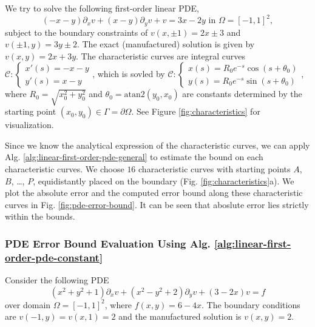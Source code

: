 \documentclass[accepted]{uai2023}
\begin{document}
    We try to solve the following first-order linear PDE,
    {
        \small
        \begin{equation} \label{eq:attractor}
            (-x -y) \partial_x v + (x - y) \partial_y v + v = 3x - 2y \text{ in } \Omega=[-1, 1]^2,
        \end{equation}
    }
    subject to the boundary constraints of $v(x, \pm1) =2x\pm 3$ and $v(\pm 1, y) = 3y \pm 2$. 
    The exact (manufactured) solution is given by $v(x, y) = 2x + 3y$.
    The characteristic curves are integral curves {\small $\mathcal{C}: \begin{cases*} x'(s) = -x - y \\[-0.25em] y'(s) = x - y \end{cases*}$}, which is sovled by {\small $\mathcal{C}: \begin{cases*} x(s) = R_0 e^{-s} \cos (s+\theta_0)\\[-0.25em] y(s) = R_0 e^{-s} \sin(s + \theta_0) \end{cases*}$}, where $R_0 = \sqrt{x_0^2+y_0^2}$ and $\theta_0 = \mathrm{atan2}(y_0, x_0)$ are constants determined by the starting point $(x_0, y_0) \in \Gamma = \partial \Omega$.
    See Figure \ref{fig:characteristics} for visualization.

    Since we know the analytical expression of the characteristic curves, we can apply Alg. \ref{alg:linear-first-order-pde-general} to estimate the bound on each characteristic curves. 
    We choose $16$ characteristic curves with starting points $A$, $B$, \dots, $P$, equidistantly placed on the boundary (Fig. \ref{fig:characteristics}a). 
    We plot the absolute error and the computed error bound along these characteristic curves in Fig. \ref{fig:pde-error-bound}.
    It can be seen that aboslute error lies strictly within the bounds.
\subsubsection{PDE Error Bound Evaluation Using Alg. \ref{alg:linear-first-order-pde-constant}}
    Consider the following PDE 
    {
        \small
        \begin{equation}\label{eq:hard-to-solve-characteristics}
            (x^2+y^2+1)\partial_x v + (x^2-y^2+2)\partial_y v + (3-2x)v = f
        \end{equation}
    }
    over domain $\Omega = [-1, 1]^2$, where $f(x, y) = 6-4x$.
    The boundary conditions are $v(-1, y) = v(x, 1) = 2$ and the manufactured solution is $v(x, y) = 2$.
    
\end{document}
